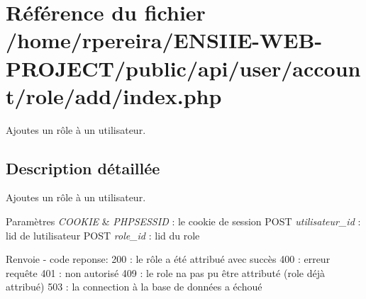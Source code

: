 \hypertarget{user_2account_2role_2add_2index_8php}{}\section{Référence du fichier /home/rpereira/\+E\+N\+S\+I\+I\+E-\/\+W\+E\+B-\/\+P\+R\+O\+J\+E\+C\+T/public/api/user/account/role/add/index.php}
\label{user_2account_2role_2add_2index_8php}


Ajoutes un rôle à un utilisateur.  




\subsection{Description détaillée}
Ajoutes un rôle à un utilisateur. 


\begin{DoxyParams}{Paramètres}
{\em C\+O\+O\+K\+IE} & {\itshape P\+H\+P\+S\+E\+S\+S\+ID} \+: le cookie de session P\+O\+ST {\itshape utilisateur\+\_\+id} \+: l\textquotesingle{}id de l\textquotesingle{}utilisateur P\+O\+ST {\itshape role\+\_\+id} \+: l\textquotesingle{}id du role \\
\hline
\end{DoxyParams}
\begin{DoxyReturn}{Renvoie}
-\/ code reponse\+: 200 \+: le rôle a été attribué avec succès 400 \+: erreur requête 401 \+: non autorisé 409 \+: le role n\textquotesingle{}a pas pu être attributé (role déjà attribué) 503 \+: la connection à la base de données a échoué 
\end{DoxyReturn}
